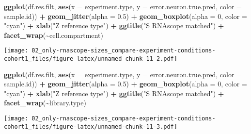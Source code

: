 \documentclass[
]{article}
\newenvironment{Shaded}{\begin{snugshade}}{\end{snugshade}}
\newcommand{\AttributeTok}[1]{\textcolor[rgb]{0.13,0.29,0.53}{#1}}
\newcommand{\DecValTok}[1]{\textcolor[rgb]{0.00,0.00,0.81}{#1}}
\newcommand{\FloatTok}[1]{\textcolor[rgb]{0.00,0.00,0.81}{#1}}
\newcommand{\FunctionTok}[1]{\textcolor[rgb]{0.13,0.29,0.53}{\textbf{#1}}}
\newcommand{\NormalTok}[1]{#1}
\newcommand{\SpecialCharTok}[1]{\textcolor[rgb]{0.81,0.36,0.00}{\textbf{#1}}}
\newcommand{\StringTok}[1]{\textcolor[rgb]{0.31,0.60,0.02}{#1}}
\begin{document}
\begin{Shaded}
\begin{Highlighting}[]
\FunctionTok{ggplot}\NormalTok{(df.res.filt, }\FunctionTok{aes}\NormalTok{(}\AttributeTok{x =}\NormalTok{ experiment.type, }
                        \AttributeTok{y =}\NormalTok{ error.neuron.true.pred, }\AttributeTok{color =}\NormalTok{ sample.id)) }\SpecialCharTok{+} \FunctionTok{geom\_jitter}\NormalTok{(}\AttributeTok{alpha =} \FloatTok{0.5}\NormalTok{) }\SpecialCharTok{+} 
  \FunctionTok{geom\_boxplot}\NormalTok{(}\AttributeTok{alpha =} \DecValTok{0}\NormalTok{, }\AttributeTok{color =} \StringTok{"cyan"}\NormalTok{) }\SpecialCharTok{+} \FunctionTok{xlab}\NormalTok{(}\StringTok{"Z reference type"}\NormalTok{) }\SpecialCharTok{+}
  \FunctionTok{ggtitle}\NormalTok{(}\StringTok{"S RNAscope matched"}\NormalTok{) }\SpecialCharTok{+} \FunctionTok{facet\_wrap}\NormalTok{(}\SpecialCharTok{\textasciitilde{}}\NormalTok{cell.compartment)}
\end{Highlighting}
\end{Shaded}

\texttt{[image: 02\_only-rnascope-sizes\_compare-experiment-conditions-cohort1\_files/figure-latex/unnamed-chunk-11-2.pdf]}

\begin{Shaded}
\begin{Highlighting}[]
\FunctionTok{ggplot}\NormalTok{(df.res.filt, }\FunctionTok{aes}\NormalTok{(}\AttributeTok{x =}\NormalTok{ experiment.type, }
                        \AttributeTok{y =}\NormalTok{ error.neuron.true.pred, }\AttributeTok{color =}\NormalTok{ sample.id)) }\SpecialCharTok{+} \FunctionTok{geom\_jitter}\NormalTok{(}\AttributeTok{alpha =} \FloatTok{0.5}\NormalTok{) }\SpecialCharTok{+} 
  \FunctionTok{geom\_boxplot}\NormalTok{(}\AttributeTok{alpha =} \DecValTok{0}\NormalTok{, }\AttributeTok{color =} \StringTok{"cyan"}\NormalTok{) }\SpecialCharTok{+} \FunctionTok{xlab}\NormalTok{(}\StringTok{"Z reference type"}\NormalTok{) }\SpecialCharTok{+}
  \FunctionTok{ggtitle}\NormalTok{(}\StringTok{"S RNAscope matched"}\NormalTok{) }\SpecialCharTok{+} \FunctionTok{facet\_wrap}\NormalTok{(}\SpecialCharTok{\textasciitilde{}}\NormalTok{library.type)}
\end{Highlighting}
\end{Shaded}

\texttt{[image: 02\_only-rnascope-sizes\_compare-experiment-conditions-cohort1\_files/figure-latex/unnamed-chunk-11-3.pdf]}
\end{document}
